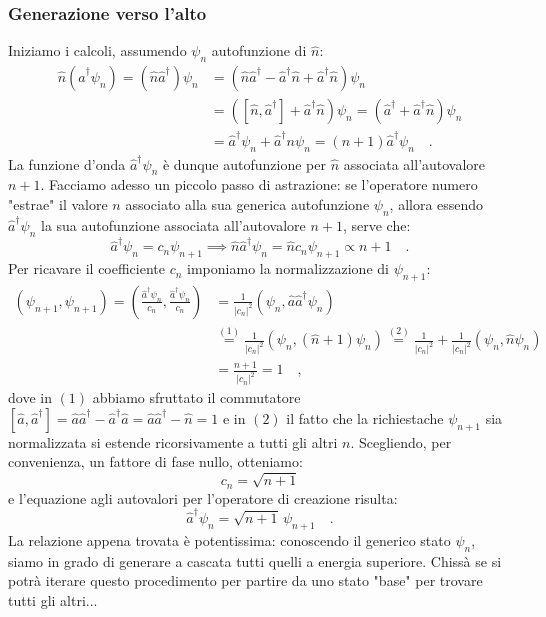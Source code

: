\subsubsection{Generazione verso l'alto}
Iniziamo i calcoli, assumendo $\psi_n$ autofunzione di $\hat{n}$:
\[
    \begin{aligned}
        \hat{n}(\hat{a}^\dagger \psi_n) = (\hat{n}\hat{a}^\dagger) \psi_n &= (\hat{n}\hat{a}^\dagger - \hat{a}^\dagger\hat{n} + \hat{a}^\dagger\hat{n} ) \psi_n \\
        &= ([\hat{n},\hat{a}^\dagger]+\hat{a}^\dagger\hat{n})\psi_n = (\hat{a}^\dagger+\hat{a}^\dagger\hat{n})\psi_n \\
        &= \hat{a}^\dagger\psi_n + \hat{a}^\dagger n\psi_n = (n+1)\hat{a}^\dagger\psi_n \quad.
    \end{aligned}
\]
La funzione d'onda $\hat{a}^\dagger\psi_n$ è dunque autofunzione per $\hat{n}$ associata all'autovalore $n+1$. Facciamo adesso un piccolo passo di astrazione: se l'operatore numero "estrae" il valore $n$ associato alla sua generica autofunzione $\psi_n$, allora essendo $\hat{a}^\dagger \psi_n$ la sua autofunzione associata all'autovalore $n+1$, serve che:
\[
    \hat{a}^\dagger\psi_n = c_n \psi_{n+1} \implies \hat{n}\hat{a}^\dagger\psi_n = \hat{n}c_n \psi_{n+1} \propto n+1 \quad.
\]
Per ricavare il coefficiente $c_n$ imponiamo la normalizzazione di $\psi_{n+1}$:
\[
    \begin{aligned}
        (\psi_{n+1}, \psi_{n+1}) = \left( \frac{\hat{a}^\dagger\psi_n}{c_n}, \frac{\hat{a}^\dagger\psi_n}{c_n} \right) &= \frac{1}{|c_n|^2} (\psi_n, \hat{a}\hat{a}^\dagger\psi_n) \\
        &\overset{(1)}{=} \frac{1}{|c_n|^2} (\psi_n, (\hat{n}+1)\psi_n) \overset{(2)}{=} \frac{1}{|c_n|^2} + \frac{1}{|c_n|^2} (\psi_n, \hat{n}\psi_n)\\ &= \frac{n+1}{|c_n|^2} = 1 \quad,
    \end{aligned}
\]
dove in $(1)$ abbiamo sfruttato il commutatore $[\hat{a}, \hat{a}^\dagger] = \hat{a}\hat{a}^\dagger - \hat{a}^\dagger\hat{a} = \hat{a}\hat{a}^\dagger - \hat{n} = 1$ e in $(2)$ il fatto che la richiestache $\psi_{n+1}$ sia normalizzata si estende ricorsivamente a tutti gli altri $n$. Scegliendo, per convenienza, un fattore di fase nullo, otteniamo:
\[
    c_n = \sqrt{n+1}
\]
e l'equazione agli autovalori per l'operatore di creazione risulta:
\[
    \hat{a}^\dagger\psi_n = \sqrt{n+1} \, \psi_{n+1} \quad.
\]
La relazione appena trovata è potentissima: conoscendo il generico stato $\psi_{n}$, siamo in grado di generare a cascata tutti quelli a energia superiore. Chissà se si potrà iterare questo procedimento per partire da uno stato "base" per trovare tutti gli altri...


